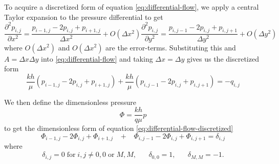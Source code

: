 To acquire a discretized form of equation \eqref{eq:differential-flow}, we apply a central Taylor expansion to the pressure differential to get
\begin{subequations}
    \begin{equation}
        \frac{\partial^2 p_{i,j}}{\partial x^2} = \frac{p_{i-1,j} -2p_{i,j} + p_{i+1,j}}{\Delta x^2} + O(\Delta x^2)
    \end{equation}
    \begin{equation}
        \frac{\partial^2 p_{i,j}}{\partial y^2} = \frac{p_{i,j-1} -2p_{i,j} + p_{i,j+1}}{\Delta y^2} + O(\Delta y^2)
    \end{equation}
\end{subequations}
where $O(\Delta x^2)$ and $O(\Delta x^2)$ are the error-terms. Substituting this and $A=\Delta x \Delta y$ into \eqref{eq:differential-flow} and taking $\Delta x = \Delta y$ gives us the discretized form
\begin{equation}
    \label{eq:differential-flow-discretized}
    \frac{kh}{\mu} \left( p_{i-1,j} -2p_{i,j} + p_{i+1,j} \right) + \frac{kh}{\mu} \left( p_{i,j-1} -2p_{i,j} + p_{i,j+1} \right) = -q_{i,j}
\end{equation}

We then define the dimensionless pressure
\begin{equation}
      \Phi = \frac{kh}{q\mu} p
\end{equation}
to get the dimensionless form of equation \eqref{eq:differential-flow-discretized} \citet{Peaceman1978Interpretation}
\begin{equation}
    \label{eq:differential-flow-discretzed-dimensionless}
     \Phi_{i-1,j} -2 \Phi_{i,j} + \Phi_{i+1,j} \;\;\; + \;\;\; \Phi_{i,j-1} -2\Phi_{i,j} + \Phi_{i,j+1}  = \delta_{i,j}
\end{equation}
where
\begin{equation}
    \delta_{i,j} = 0 \;\mathrm{for}\; i,j \neq 0,0 \;\mathrm{or}\; M,M, \;\;\;\;\;\;
    \delta_{0,0} = 1, \;\;\;\;\;\;
    \delta_{M,M} = -1.
\end{equation}

